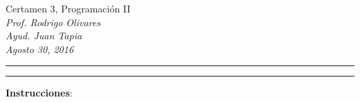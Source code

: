 \documentclass[10pt]{article}
\begin{document}
\begin{center}
    {\Large Certamen 3, Programaci\'on II} \\
    \emph{\small Prof. Rodrigo Olivares} \\
    \emph{\small Ayud. Juan Tapia} \\
    \emph{\scriptsize Agosto 30, 2016}
\end{center}
\vspace*{-35pt}
\begin{center}
    \rule{1\textwidth}{.3pt}
\end{center}
\vspace*{-42pt}
\begin{center}
    \rule{1\textwidth}{2pt}
\end{center}

\vspace*{-15pt}
{\small \textbf{Instrucciones}:}
\vspace*{-15pt}
\end{document}
